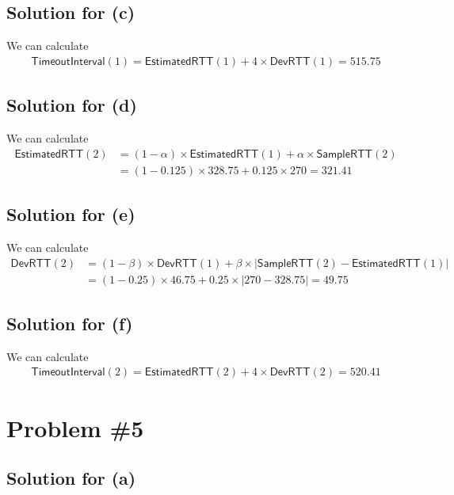 \documentclass{scrartcl}
\begin{document}
\subsection{Solution for (c)}

We can calculate
\begin{align*}
\mathsf{TimeoutInterval}(1)
= \mathsf{EstimatedRTT}(1) + 4 \times \mathsf{DevRTT}(1)
= 515.75
\end{align*}

\subsection{Solution for (d)}

We can calculate
\begin{align*}
\mathsf{EstimatedRTT}(2)
&= (1 - \alpha) \times \mathsf{EstimatedRTT}(1) + \alpha \times
\mathsf{SampleRTT}(2) \\
&= (1 - 0.125) \times 328.75 + 0.125 \times 270
= 321.41
\end{align*}

\subsection{Solution for (e)}

We can calculate
\begin{align*}
\mathsf{DevRTT}(2)
&= (1 - \beta) \times \mathsf{DevRTT}(1) + \beta \times |\mathsf{SampleRTT}(2) -
\mathsf{EstimatedRTT}(1)| \\
&= (1 - 0.25) \times 46.75 + 0.25 \times |270 - 328.75|
= 49.75
\end{align*}

\subsection{Solution for (f)}

We can calculate
\begin{align*}
\mathsf{TimeoutInterval}(2)
= \mathsf{EstimatedRTT}(2) + 4 \times \mathsf{DevRTT}(2)
= 520.41
\end{align*}

\section{Problem \#5}

\subsection{Solution for (a)}
\end{document}
